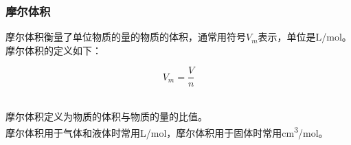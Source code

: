 \documentclass[UTF8]{ctexart}
\begin{document}
\subsubsection{摩尔体积}
    摩尔体积衡量了单位物质的量的物质的体积，通常用符号$V_m$表示，单位是\si{L/mol}。\\[3mm]
    摩尔体积的定义如下：
    \begin{large}
        \begin{equation*}
            V_m=\frac{V}{n}
        \end{equation*}
    \end{large}\\
    摩尔体积定义为物质的体积与物质的量的比值。\\[3mm]
    摩尔体积用于气体和液体时常用\si{L/mol}，摩尔体积用于固体时常用\si{cm^3/mol}。

\newpage
\end{document}
